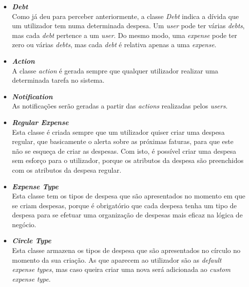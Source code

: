\begin{itemize}
	\item \textbf{\textit{Debt}}\\
	Como já deu para perceber anteriormente, a classe \textit{Debt} indica a dívida que um utilizador tem numa determinada despesa. Um \textit{user} pode ter várias \textit{debts}, mas cada \textit{debt} pertence a um \textit{user}. Do mesmo modo, uma \textit{expense} pode ter zero ou várias \textit{debts}, mas cada \textit{debt} é relativa apenas a uma \textit{expense}.

	\item \textbf{\textit{Action}}\\
	A classe \textit{action} é gerada sempre que qualquer utilizador realizar uma determinada tarefa no sistema.

	\item \textbf{\textit{Notification}}\\
	As notificações serão geradas a partir das \textit{actions} realizadas pelos \textit{users}.

	\item \textbf{\textit{Regular Expense}}\\
	Esta classe é criada sempre que um utilizador quiser criar uma despesa regular, que basicamente o alerta sobre as próximas faturas, para que este não se esqueça de criar as despesas. Com isto, é possível criar uma despesa sem esforço para o utilizador, porque os atributos da despesa são preenchidos com os atributos da despesa regular.

	\item \textbf{\textit{Expense Type}}\\
	Esta classe tem os tipos de despesa que são apresentados no momento em que se criam despesas, porque é obrigatório que cada despesa tenha um tipo de despesa para se efetuar uma organização de despesas mais eficaz na lógica de negócio.

	\item \textbf{\textit{Circle Type}}\\
	Esta classe armazena os tipos de despesa que são apresentados no círculo no momento da sua criação. As que aparecem ao utilizador são as \textit{default expense types}, mas caso queira criar uma nova será adicionada ao \textit{custom expense type}.

\end{itemize}
